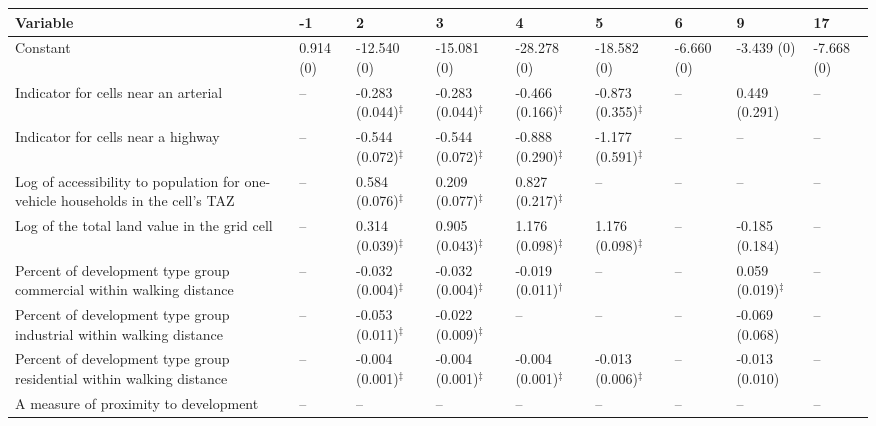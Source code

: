 
\begin{tabular}{p{3in}p{0.5in}p{0.5in}p{0.5in}p{0.5in}p{0.5in}p{0.5in}p{0.5in}p{0.5in}}
\hline\hline
Variable & -1 & 2 & 3 & 4 & 5 & 6 & 9 & 17 \\\hline
Constant & 0.914 (0) & -12.540 (0) & -15.081 (0) & -28.278 (0) & -18.582 (0) & -6.660 (0) & -3.439 (0) & -7.668 (0) \\
Indicator for cells near an arterial & -- & -0.283 (0.044)$^{\ddagger}$ & -0.283 (0.044)$^{\ddagger}$ & -0.466 (0.166)$^{\ddagger}$ & -0.873 (0.355)$^{\ddagger}$ & -- & 0.449 (0.291) & -- \\
Indicator for cells near a highway & -- & -0.544 (0.072)$^{\ddagger}$ & -0.544 (0.072)$^{\ddagger}$ & -0.888 (0.290)$^{\ddagger}$ & -1.177 (0.591)$^{\ddagger}$ & -- & -- & -- \\
Log of accessibility to population for one-vehicle households in the cell's TAZ & -- & 0.584 (0.076)$^{\ddagger}$ & 0.209 (0.077)$^{\ddagger}$ & 0.827 (0.217)$^{\ddagger}$ & -- & -- & -- & -- \\
Log of the total land value in the grid cell & -- & 0.314 (0.039)$^{\ddagger}$ & 0.905 (0.043)$^{\ddagger}$ & 1.176 (0.098)$^{\ddagger}$ & 1.176 (0.098)$^{\ddagger}$ & -- & -0.185 (0.184) & -- \\
Percent of development type group commercial within walking distance & -- & -0.032 (0.004)$^{\ddagger}$ & -0.032 (0.004)$^{\ddagger}$ & -0.019 (0.011)$^{\dagger}$ & -- & -- & 0.059 (0.019)$^{\ddagger}$ & -- \\
Percent of development type group industrial within walking distance & -- & -0.053 (0.011)$^{\ddagger}$ & -0.022 (0.009)$^{\ddagger}$ & -- & -- & -- & -0.069 (0.068) & -- \\
Percent of development type group residential within walking distance & -- & -0.004 (0.001)$^{\ddagger}$ & -0.004 (0.001)$^{\ddagger}$ & -0.004 (0.001)$^{\ddagger}$ & -0.013 (0.006)$^{\ddagger}$ & -- & -0.013 (0.010) & -- \\
A measure of proximity to development & -- & -- & -- & -- & -- & -- & -- & -- \\
\hline\hline
\end{tabular}
